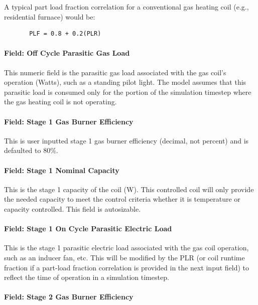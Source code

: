 A typical part load fraction correlation for a conventional gas heating coil (e.g., residential furnace) would be:

\begin{lstlisting}
       PLF = 0.8 + 0.2(PLR)
\end{lstlisting}

\paragraph{Field: Off Cycle Parasitic Gas Load}\label{field-parasitic-gas-load-1}

This numeric field is the parasitic gas load associated with the gas coil's operation (Watts), such as a standing pilot light. The model assumes that this parasitic load is consumed only for the portion of the simulation timestep where the gas heating coil is not operating.

\paragraph{Field: Stage 1 Gas Burner Efficiency}\label{field-stage-1-gas-burner-efficiency}

This is user inputted stage 1 gas burner efficiency (decimal, not percent) and is defaulted to 80\%.

\paragraph{Field: Stage 1 Nominal Capacity}\label{field-stage-1-nominal-capacity-1}

This is the stage 1 capacity of the coil (W). This controlled coil will only provide the needed capacity to meet the control criteria whether it is temperature or capacity controlled. This field is autosizable.

\paragraph{Field: Stage 1 On Cycle Parasitic Electric Load}\label{field-stage-1-parasitic-electric-load}

This is the stage 1 parasitic electric load associated with the gas coil operation, such as an inducer fan, etc. This will be modified by the PLR (or coil runtime fraction if a part-load fraction correlation is provided in the next input field) to reflect the time of operation in a simulation timestep.

\paragraph{Field: Stage 2 Gas Burner Efficiency}\label{field-stage-2-gas-burner-efficiency}

